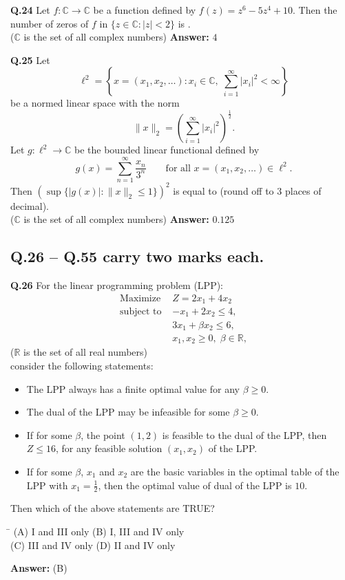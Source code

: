 \documentclass[11pt,a4paper]{article}
\newcommand{\optsfourA}[4]{%
  \begin{tabbing}
    \hspace{0.48\linewidth}\=\kill
    (A) #1 \> (B) #2 \\[2pt]
    (C) #3 \> (D) #4
  \end{tabbing}%
}
\newcommand{\ans}[1]{\textbf{Answer:} #1\par\medskip}
\begin{document}
\textbf{Q.24} Let $f : \mathbb{C} \to \mathbb{C}$ be a function defined by $f(z) = z^6 - 5z^4 + 10$. Then the number of zeros of $f$ in $\{z \in \mathbb{C} : |z| < 2\}$ is \underline{\hspace{2cm}}.\\
($\mathbb{C}$ is the set of all complex numbers)
\ans{$4$}

\textbf{Q.25} Let
\[
  \ell^2 = \left\{x = (x_1, x_2, \dots) : x_i \in \mathbb{C},\; \sum_{i=1}^{\infty} |x_i|^2 < \infty\right\}
\]
be a normed linear space with the norm
\[
  \|x\|_2 = \left(\sum_{i=1}^{\infty} |x_i|^2\right)^{\frac{1}{2}}.
\]
Let $g : \ell^2 \to \mathbb{C}$ be the bounded linear functional defined by
\[
  g(x) = \sum_{n=1}^{\infty} \frac{x_n}{3^n} \qquad \text{for all } x = (x_1, x_2, \dots) \in \ell^2.
\]
Then $\left(\sup\{|g(x)| : \|x\|_2 \le 1\}\right)^2$ is equal to \underline{\hspace{2cm}} (round off to $3$ places of decimal).\\
($\mathbb{C}$ is the set of all complex numbers)
\ans{$0.125$}

\subsection*{Q.26 -- Q.55 carry two marks each.}

\textbf{Q.26} For the linear programming problem (LPP):
\begin{align*}
  \text{Maximize } & Z = 2x_1 + 4x_2 \\
  \text{subject to } & -x_1 + 2x_2 \le 4, \\
                     & 3x_1 + \beta x_2 \le 6, \\
                     & x_1, x_2 \ge 0,\; \beta \in \mathbb{R},
\end{align*}
($\mathbb{R}$ is the set of all real numbers)\\
consider the following statements:
\begin{itemize}
  \setlength{\itemsep}{1pt}\setlength{\parskip}{0pt}
  \item[I.] The LPP always has a finite optimal value for any $\beta \ge 0$.
  \item[II.] The dual of the LPP may be infeasible for some $\beta \ge 0$.
  \item[III.] If for some $\beta$, the point $(1, 2)$ is feasible to the dual of the LPP, then $Z \le 16$, for any feasible solution $(x_1, x_2)$ of the LPP.
  \item[IV.] If for some $\beta$, $x_1$ and $x_2$ are the basic variables in the optimal table of the LPP with $x_1 = \frac{1}{2}$, then the optimal value of dual of the LPP is $10$.
\end{itemize}
Then which of the above statements are TRUE?
\optsfourA{I and III only}{I, III and IV only}{III and IV only}{II and IV only}
\ans{(B)}
\end{document}
